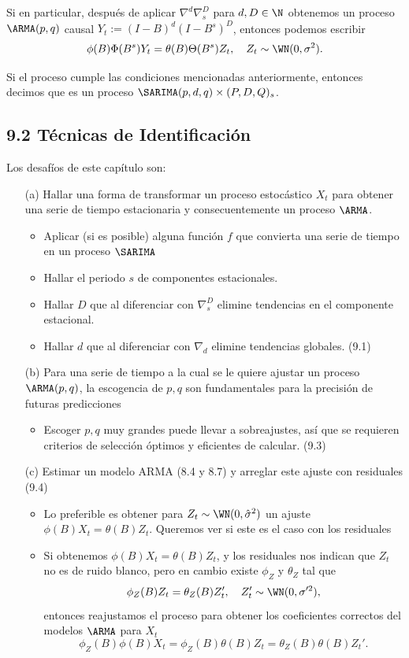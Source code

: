 Si en particular, después de aplicar $\nabla^d \nabla_s^D$ para $d, D \in \N$ obtenemos un proceso $\ARMA(p,q)$ causal $Y_t := (I-B)^d (I-B^s)^D$, entonces podemos escribir
\[ \phi(B) \Phi(B^s) Y_t = \theta(B) \Theta(B^s) Z_t,\quad Z_t \sim \WN(0,\sigma^2). \]

Si el proceso cumple las condiciones mencionadas anteriormente, entonces decimos que es un proceso $\SARIMA(p,d,q)\times (P,D,Q)_s$.



\subsection*{9.2 Técnicas de Identificación}

Los desafíos de este capítulo son:
\begin{itemize}
    \item[(a)] Hallar una forma de transformar un proceso estocástico $X_t$ para obtener una serie de tiempo estacionaria y consecuentemente un proceso $\ARMA$.
    \begin{itemize}
        \item Aplicar (si es posible) alguna función $f$ que convierta una serie de tiempo en un proceso $\SARIMA$
        \item Hallar el periodo $s$ de componentes estacionales.
        \item Hallar $D$ que al diferenciar con $\nabla_s^D$ elimine tendencias en el componente estacional.
        \item Hallar $d$ que al diferenciar con $\nabla_d$ elimine tendencias globales. (9.1)
    \end{itemize}
    \item[(b)] Para una serie de tiempo a la cual se le quiere ajustar un proceso $\ARMA(p,q)$, la escogencia de $p,q$ son fundamentales para la precisión de futuras predicciones
    \begin{itemize}
        \item Escoger $p,q$ muy grandes puede llevar a sobreajustes, así que se requieren criterios de selección óptimos y eficientes de calcular. (9.3)
    \end{itemize}
    \item[(c)] Estimar un modelo ARMA (8.4 y 8.7) y arreglar este ajuste con residuales (9.4)
    \begin{itemize}
        \item Lo preferible es obtener para $Z_t \sim \WN(0,\hat{\sigma}^2)$ un ajuste $\phi(B) X_t = \theta(B) Z_t$. Queremos ver si este es el caso con los residuales
        \item Si obtenemos $\phi(B) X_t = \theta(B) Z_t$, y los residuales nos indican que $Z_t$ no es de ruido blanco, pero en cambio existe $\phi_Z$ y $\theta_Z$ tal que
        \[ \phi_Z(B) Z_t = \theta_Z(B) Z'_t,\quad Z_t' \sim \WN(0,\sigma'^{2}), \]
        entonces reajustamos el proceso para obtener los coeficientes correctos del modelos $\ARMA$ para $X_t$
        \[ \phi_Z(B) \phi(B) X_t = \phi_Z(B) \theta(B) Z_t = \theta_Z(B) \theta(B) Z_t'. \]
    \end{itemize}
\end{itemize}

